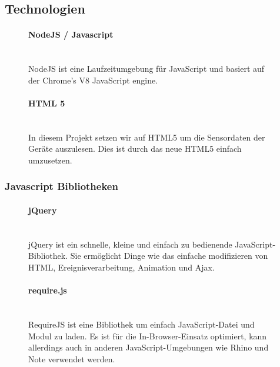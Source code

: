 \documentclass[a4paper]{spie}  %
\begin{document}
\subsection{Technologien} %
\begin{figure}[H]
\begin{minipage}[t]{0.4\textwidth}
\vspace{0pt}
\paragraph{NodeJS / Javascript}\mbox{}\\
NodeJS ist eine Laufzeitumgebung für JavaScript und basiert auf der Chrome's V8 JavaScript engine. 

\end{minipage}
\hfill
\begin{minipage}[t]{0.5\textwidth}
\vspace{0pt}
\paragraph{HTML 5}\mbox{}\\
In diesem Projekt setzen wir auf HTML5 um die Sensordaten der Geräte auszulesen. Dies ist durch das neue HTML5 einfach umzusetzen.
\end{minipage}
\end{figure}

\subsubsection{Javascript Bibliotheken}

\begin{figure}[H]
\begin{minipage}[t]{0.4\textwidth}
\vspace{0pt}
\paragraph{jQuery}\mbox{}\\
jQuery ist ein schnelle, kleine und einfach zu bedienende JavaScript-Bibliothek. Sie ermöglicht Dinge wie das einfache modifizieren von HTML, Ereignisverarbeitung, Animation und Ajax.
\end{minipage}
\hfill
\begin{minipage}[t]{0.5\textwidth}
\vspace{0pt}
\paragraph{require.js}\mbox{}\\
RequireJS ist eine Bibliothek um einfach JavaScript-Datei und Modul zu laden. Es ist für die In-Browser-Einsatz optimiert, kann allerdings auch in anderen JavaScript-Umgebungen wie Rhino und Note verwendet werden.
\end{minipage}
\end{figure}
\end{document}
